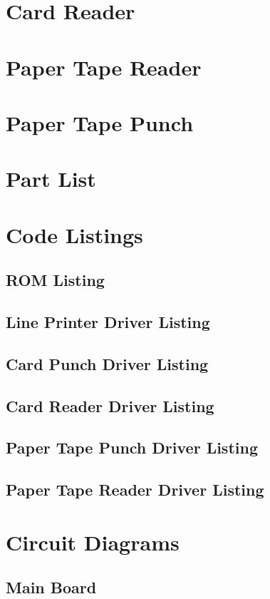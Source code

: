 \documentclass{book}
\begin{document}
\chapter{Card Reader}
\chapter{Paper Tape Reader}
\chapter{Paper Tape Punch}
\appendix
\chapter{Part List}
\chapter{Code Listings}
\lstset{numbers=left, numberstyle=\tiny, stepnumber=1, numbersep=5pt}
\section{ROM Listing}
\cleardoublepage
\section{Line Printer Driver Listing}

\cleardoublepage
\section{Card Punch Driver Listing}
\cleardoublepage
\section{Card Reader Driver Listing}
\cleardoublepage
\section{Paper Tape Punch Driver Listing}
\cleardoublepage
\section{Paper Tape Reader Driver Listing}
\chapter{Circuit Diagrams}
\section{Main Board}
\cleardoublepage
\end{document}
